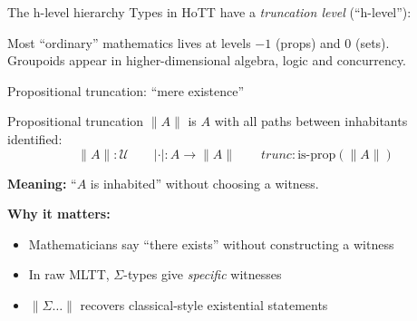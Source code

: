 \documentclass[aspectratio=169,12pt]{beamer}
\newcommand{\isProp}{\mathrm{is\text{-}prop}}
\newcommand{\isSet}{\mathrm{is\text{-}set}}
\newcommand{\isGroupoid}{\mathrm{is\text{-}groupoid}}
\newcommand{\trunc}[1]{\lVert #1 \rVert}
\newcommand{\tmark}[1]{\lvert #1 \rvert}
\begin{document}
\begin{frame}{The h-level hierarchy}
  Types in HoTT have a \emph{truncation level} (``h-level''):
  \medskip
  \begin{center}
  \end{center}
  \pause\medskip
  Most ``ordinary'' mathematics lives at levels $-1$ (props) and $0$ (sets). \\
  Groupoids appear in higher-dimensional algebra, logic and concurrency.
\end{frame}

\begin{frame}{Propositional truncation: ``mere existence''}
  \begin{block}{Propositional truncation}
    $\trunc{A}$ is $A$ with all paths between inhabitants identified:
    \[
      \trunc{A} : \mathcal{U}
      \qquad
      \tmark{\cdot} : A \to \trunc{A}
      \qquad
      trunc : \isProp(\trunc{A})
    \]
  \end{block}
  \pause\medskip
  \textbf{Meaning:} ``$A$ is inhabited'' without choosing a witness.
  \pause\medskip

  \textbf{Why it matters:}
  \begin{itemize}
    \item Mathematicians say ``there exists'' without constructing a witness
    \item In raw MLTT, $\Sigma$-types give \emph{specific} witnesses
    \item $\trunc{\Sigma\ldots}$ recovers classical-style
          existential statements
  \end{itemize}
\end{frame}
\end{document}

